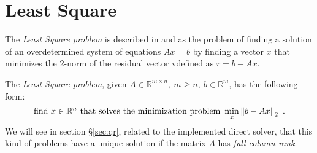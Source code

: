\section{Least Square}
\label{sec:ls}
The \textit{Least Square problem} is described in \parencite[Lecture 11]{Bau} and \parencite[Chap. 3]{elden} as the problem of finding a solution of an overdetermined system of equations $Ax = b$ by finding a vector $x$ that minimizes the 2-norm of the residual vector  vdefined as $r = b - Ax$.

The \textit{Least Square problem}, given $A\in\mathbb{R}^{m\times n},\ m\geq n,\ b\in\mathbb{R}^m$, has the following form:
\begin{equation}
    \label{eq:ls}
    \text{find}\ x\in\mathbb{R}^n\ \text{that solves the minimization problem}\ \min_{x}\left\lVert b - Ax \right\rVert_2\ \text{.}
\end{equation}
We will see in section \S\ref{sec:qr}, related to the implemented direct solver, that this kind of problems have a unique solution if the matrix $A$ has \textit{full column rank}.